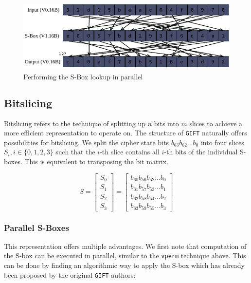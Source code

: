\begin{figure}[h!]
    \centering
    \includegraphics[width=\textwidth]{Figures/tbl_example.pdf}
    \caption{Performing the S-Box lookup in parallel}
\end{figure}

\subsection{Bitslicing}

Bitslicing refers to the technique of splitting up $n$ bits into $m$ slices to
achieve a more efficient representation to operate on. The structure of
\texttt{GIFT} naturally offers possibilities for bitslicing. We split the
cipher state bits $b_{63}b_{62}\dots b_0$ into four slices $S_i,
i\in\{0,1,2,3\}$ such that the $i$-th slice contains all $i$-th bits of the
individual S-boxes. This is equivalent to transposing the bit matrix.

\[
    S=\begin{bmatrix}
        S_0\\
        S_1\\
        S_2\\
        S_3
    \end{bmatrix}
    =\begin{bmatrix}
        b_{60}b_{56}b_{52}\dots b_0\\
        b_{61}b_{57}b_{53}\dots b_1\\
        b_{62}b_{58}b_{54}\dots b_2\\
        b_{63}b_{59}b_{55}\dots b_3
    \end{bmatrix}
\]

\subsubsection{Parallel S-Boxes}

This representation offers multiple advantages. We first note that computation
of the S-box can be executed in parallel, similar to the \texttt{vperm}
technique above. This can be done by finding an algorithmic way to apply the
S-box which has already been proposed by the original \texttt{GIFT} authors:


